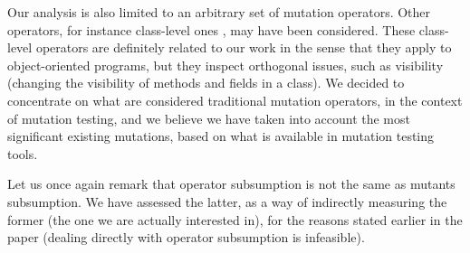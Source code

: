 Our analysis is also limited to an arbitrary set of mutation operators. Other operators, for instance class-level ones \cite{bibliography.mutation.class-level-ops}, may have been considered. These class-level operators are definitely related to our work in the sense that they apply to object-oriented programs, but they inspect orthogonal issues, such as visibility (changing the visibility of methods and fields in a class). We decided to concentrate on what are considered traditional mutation operators, in the context of mutation testing, and we believe we have taken into account the most significant existing mutations, based on what is available in mutation testing tools. 

Let us once again remark that operator subsumption is not the same as mutants subsumption. We have assessed the latter, as a way of indirectly measuring the former (the one we are actually interested in), for the reasons stated earlier in the paper (dealing directly with operator subsumption is infeasible). 

